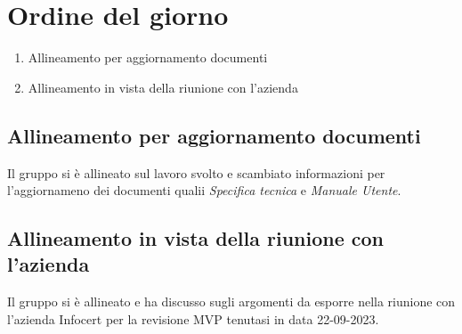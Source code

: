 \section{Ordine del giorno}
\begin{enumerate}
\item Allineamento per aggiornamento documenti
\item Allineamento in vista della riunione con l'azienda
\end{enumerate}

\subsection{Allineamento per aggiornamento documenti}
Il gruppo si è allineato sul lavoro svolto e scambiato informazioni per l'aggiornameno dei documenti qualii \textit{Specifica tecnica} e \textit{Manuale Utente}. 
\subsection{Allineamento in vista della riunione con l'azienda}
Il gruppo si è allineato e ha discusso sugli argomenti da esporre nella riunione con l'azienda Infocert per la revisione MVP tenutasi in data 22-09-2023.